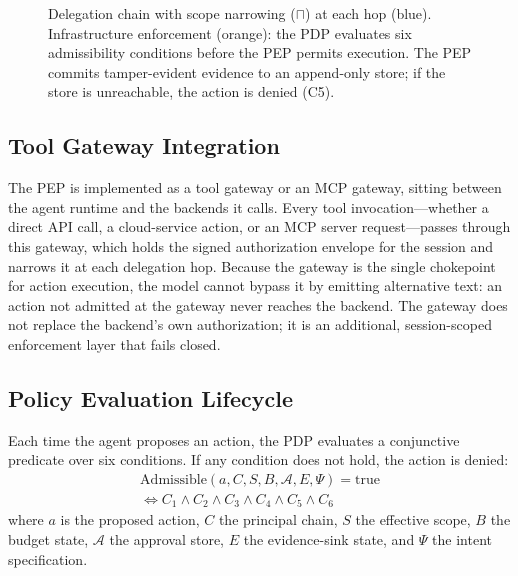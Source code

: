 \documentclass[sigconf,nonacm]{acmart}
\begin{document}
\begin{figure}[t]
\caption{Delegation chain with scope narrowing ($\sqcap$) at each hop (blue). Infrastructure enforcement (orange): the PDP evaluates six admissibility conditions before the PEP permits execution. The PEP commits tamper-evident evidence to an append-only store; if the store is unreachable, the action is denied (C5).}
\label{fig:architecture}
\end{figure}

\subsection{Tool Gateway Integration}\label{sec:gateway}

The PEP is implemented as a tool gateway or an MCP gateway, sitting between the agent runtime and the backends it calls. Every tool invocation---whether a direct API call, a cloud-service action, or an MCP server request---passes through this gateway, which holds the signed authorization envelope for the session and narrows it at each delegation hop. Because the gateway is the single chokepoint for action execution, the model cannot bypass it by emitting alternative text: an action not admitted at the gateway never reaches the backend. The gateway does not replace the backend's own authorization; it is an additional, session-scoped enforcement layer that fails closed.

\subsection{Policy Evaluation Lifecycle}\label{sec:lifecycle}

Each time the agent proposes an action, the PDP evaluates a conjunctive predicate over six conditions. If any condition does not hold, the action is denied:
\begin{multline*}
\mathrm{Admissible}(a, C, S, B, \mathcal{A}, E, \Psi) = \mathrm{true} \\
\iff C_1 \wedge C_2 \wedge C_3 \wedge C_4 \wedge C_5 \wedge C_6
\end{multline*}
where $a$ is the proposed action, $C$ the principal chain, $S$ the effective scope, $B$ the budget state, $\mathcal{A}$ the approval store, $E$ the evidence-sink state, and $\Psi$ the intent specification.
\end{document}
